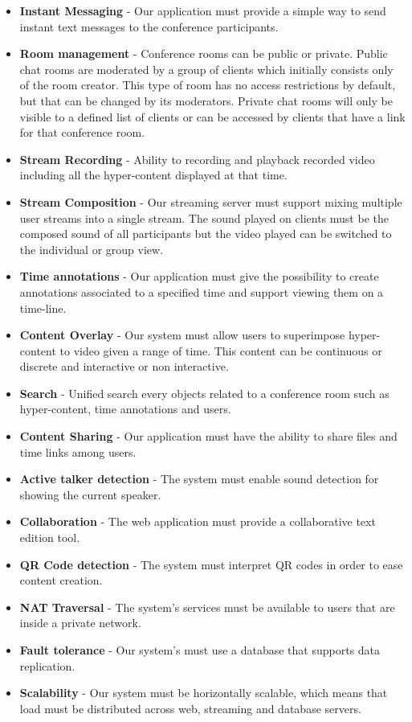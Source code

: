 \begin{itemize}
 \item \textbf{Instant Messaging} - Our application must provide a simple way to send instant text messages to the conference participants.
 \item \textbf{Room management} - Conference rooms can be public or private. Public chat rooms are moderated by a group of clients which initially consists only of the room creator. This type of room has no access restrictions by default, but that can be changed by its moderators. Private chat rooms will only be visible to a defined list of clients or can be accessed by clients that have a link for that conference room.
 \item \textbf{Stream Recording} - Ability to recording and playback recorded video including all the hyper-content displayed at that time.
 \item \textbf{Stream Composition} - Our streaming server must support mixing multiple user streams into a single stream. The sound played on clients must be the composed sound of all participants but the video played can be switched to the individual or group view.
 \item \textbf{Time annotations} - Our application must give the possibility to create annotations associated to a specified time and support viewing them on a time-line. 
 \item \textbf{Content Overlay} - Our system must allow users to superimpose hyper-content to video given a range of time. This content can be continuous or discrete and interactive or non interactive.
 \item \textbf{Search} - Unified search every objects related to a conference room such as hyper-content, time annotations and users.
 \item \textbf{Content Sharing} - Our application must have the ability to share files and time links among users.
 \item \textbf{Active talker detection} - The system must enable sound detection for showing the current speaker.
 \item \textbf{Collaboration} - The web application must provide a collaborative text edition tool.
 \item \textbf{QR Code detection} - The system must interpret \ac{QR} codes in order to ease content creation.
 \item \textbf{NAT Traversal} - The system's services must be available to users that are inside a private network.
 \item \textbf{Fault tolerance} - Our system's must use a database that supports data replication.
 \item \textbf{Scalability} - Our system must be horizontally scalable, which means that load must be distributed across web, streaming and database servers.
\end{itemize}

